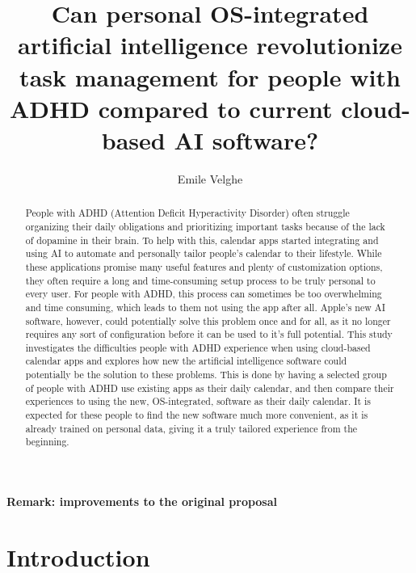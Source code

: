 \documentclass[english]{hogent-article}
\title{Can personal OS-integrated artificial intelligence revolutionize task management for people with ADHD compared to current cloud-based AI software?}
\author{Emile Velghe}
\begin{document}
\begin{abstract}
  People with ADHD (Attention Deficit Hyperactivity Disorder) often struggle organizing their daily obligations and prioritizing important tasks because of the lack of dopamine in their brain. To help with this, calendar apps started integrating and using AI to automate and personally tailor people’s calendar to their lifestyle. While these applications promise many useful features and plenty of customization options, they often require a long and time-consuming setup process to be truly personal to every user. For people with ADHD, this process can sometimes be too overwhelming and time consuming, which leads to them not using the app after all. Apple's new AI software, however, could potentially solve this problem once and for all, as it no longer requires any sort of configuration before it can be used to it's full potential. This study investigates the difficulties people with ADHD experience when using cloud-based calendar apps and explores how new the artificial intelligence software could potentially be the solution to these problems. This is done by having a selected group of people with ADHD use existing apps as their daily calendar, and then compare their experiences to using the new, OS-integrated, software as their daily calendar. It is expected for these people to find the new software much more convenient, as it is already trained on personal data, giving it a truly tailored experience from the beginning. 
\end{abstract}

\tableofcontents

\bigskip

\paragraph{Remark: improvements to the original proposal}

\section{Introduction}%
\label{sec:Introduction}
\end{document}

